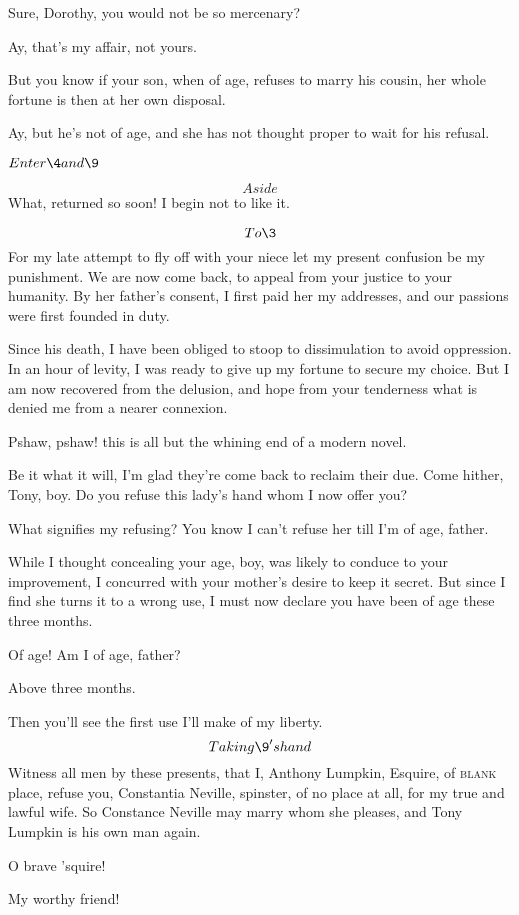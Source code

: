 \documentclass{book}
\begin{document}
\3  Sure, Dorothy, you would not be so mercenary?

\7  Ay, that's my affair, not yours.

\3  But you know if your son, when of age, refuses to marry
his cousin, her whole fortune is then at her own disposal.

\7  Ay, but he's not of age, and she has not thought
proper to wait for his refusal.


\(Enter \4 and \9\)


\7  \[Aside\]  What, returned so soon!  I begin not to
like it.

\4  \[To \3\]  For my late attempt to fly off with your
niece let my present confusion be my punishment.  We are now come back,
to appeal from your justice to your humanity.  By her father's consent,
I first paid her my addresses, and our passions were first founded in
duty.

\9  Since his death, I have been obliged to stoop to
dissimulation to avoid oppression.  In an hour of levity, I was ready
to give up my fortune to secure my choice.  But I am now recovered from
the delusion, and hope from your tenderness what is denied me from a
nearer connexion.

\7  Pshaw, pshaw! this is all but the whining end of a
modern novel.

\3  Be it what it will, I'm glad they're come back to reclaim
their due.  Come hither, Tony, boy.  Do you refuse this lady's hand
whom I now offer you?

\5  What signifies my refusing?  You know I can't refuse her till
I'm of age, father.

\3  While I thought concealing your age, boy, was likely to
conduce to your improvement, I concurred with your mother's desire to
keep it secret.  But since I find she turns it to a wrong use, I must
now declare you have been of age these three months.

\5  Of age!  Am I of age, father?

\3  Above three months.

\5  Then you'll see the first use I'll make of my liberty.  \[Taking
\9's hand\]  Witness all men by these presents, that I,
Anthony Lumpkin, Esquire, of \textsc{blank} place, refuse you, Constantia
Neville, spinster, of no place at all, for my true and lawful wife.  So
Constance Neville may marry whom she pleases, and Tony Lumpkin is his
own man again.

\1  O brave 'squire!

\4  My worthy friend!
\end{document}

